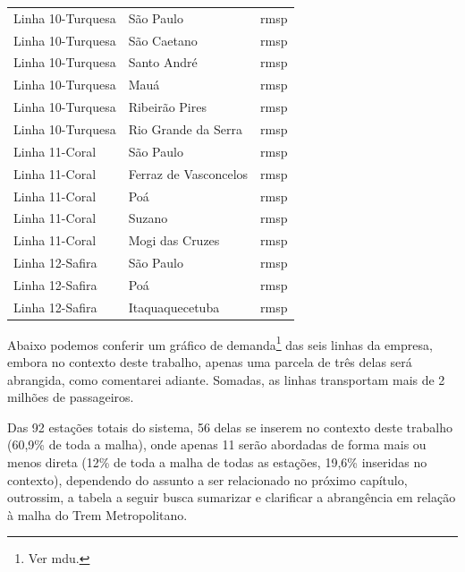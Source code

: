 \begin{center}
\begin{longtable}{|l|l|l|}
			Linha 10-Turquesa & São Paulo & \gls{rmsp} \\
			Linha 10-Turquesa & São Caetano & \gls{rmsp} \\
			Linha 10-Turquesa & Santo André & \gls{rmsp} \\
			Linha 10-Turquesa & Mauá & \gls{rmsp} \\
			Linha 10-Turquesa & Ribeirão Pires & \gls{rmsp} \\
			Linha 10-Turquesa & Rio Grande da Serra & \gls{rmsp} \\
			Linha 11-Coral & São Paulo & \gls{rmsp} \\
			Linha 11-Coral & Ferraz de Vasconcelos & \gls{rmsp} \\
			Linha 11-Coral & Poá & \gls{rmsp} \\
			Linha 11-Coral & Suzano & \gls{rmsp} \\
			Linha 11-Coral & Mogi das Cruzes & \gls{rmsp} \\
			Linha 12-Safira & São Paulo & \gls{rmsp} \\
			Linha 12-Safira & Poá & \gls{rmsp} \\
			Linha 12-Safira & Itaquaquecetuba & \gls{rmsp} \\
		\end{longtable}
	\end{center}	
	
	Abaixo podemos conferir um gráfico de demanda\footnote{Ver \gls{mdu}.} das seis linhas da empresa, embora no contexto deste trabalho, apenas uma parcela de três delas será abrangida, como comentarei adiante. Somadas, as linhas transportam mais de 2 milhões de passageiros.

	\begin{center}
	\end{center}

	Das 92 estações totais do sistema, 56 delas se inserem no contexto deste trabalho (60,9\% de toda a malha), onde apenas 11 serão abordadas de forma mais ou menos direta (12\% de toda a malha de todas as estações, 19,6\% inseridas no contexto), dependendo do assunto a ser relacionado no próximo capítulo, outrossim, a tabela a seguir busca sumarizar e clarificar a abrangência em relação à malha do Trem Metropolitano.
	
